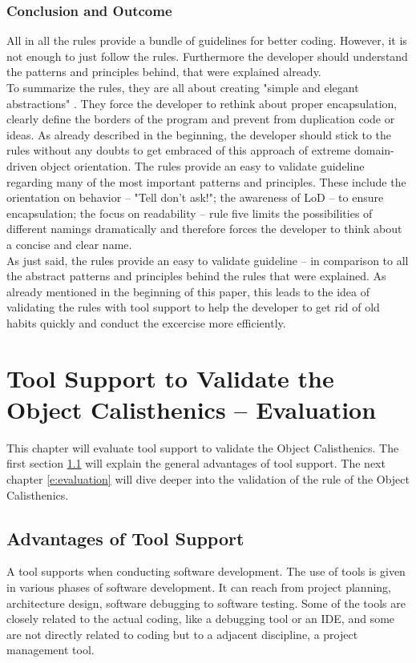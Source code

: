 \subsection*{Conclusion and Outcome}
All in all the rules provide a bundle of guidelines for better coding. However, it is not enough to just follow the rules. Furthermore the developer should understand the patterns and principles behind, that were explained already. 
\\

To summarize the rules, they are all about creating "simple and elegant abstractions" \cite[p. 80]{oc2008}. They force the developer to rethink about proper encapsulation, clearly define the borders of the program and prevent from duplication code or ideas. As already described in the beginning, the developer should stick to the rules without any doubts to get embraced of this approach of extreme domain-driven object orientation. The rules provide an easy to validate guideline regarding many of the most important patterns and principles. These include the orientation on behavior -- "Tell don't ask!"; the awareness of \ac{LoD} -- to ensure encapsulation; the focus on readability -- rule five limits the possibilities of different namings dramatically and therefore forces the developer to think about a concise and clear name. 
\\

As just said, the rules provide an easy to validate guideline -- in comparison to all the abstract patterns and principles behind the rules that were explained. As already mentioned in the beginning of this paper, this leads to the idea of validating the rules with tool support to help the developer to get rid of old habits quickly and conduct the excercise more efficiently. 







\chapter{Tool Support to Validate the Object Calisthenics -- Evaluation}
\label{Evaluation}
This chapter will evaluate tool support to validate the Object Calisthenics. The first section \ref{e:advantages} will explain the general advantages of tool support. The next chapter \ref{e:evaluation} will dive deeper into the validation of the rule of the Object Calisthenics.

\section{Advantages of Tool Support}
\label{e:advantages}
A tool supports when conducting software development. The use of tools is given in various phases of software development. It can reach from project planning, architecture design, software debugging to software testing. Some of the tools are closely related to the actual coding, like a debugging tool or an \acf{IDE}, and some are not directly related to coding but to a adjacent discipline, a project management tool. 


